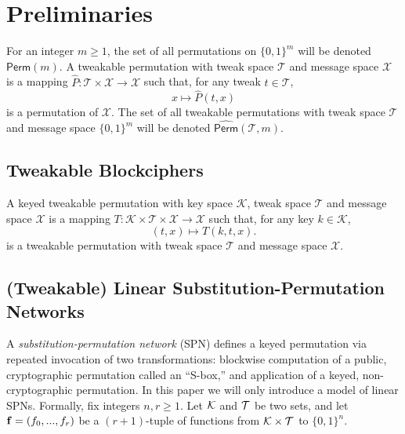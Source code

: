 

\section{Preliminaries}
\label{sec:preliminary}

For an integer $m\geq1$, the set of all permutations on $\{0, 1\}^m$ will be denoted $\textsf{Perm}(m)$. A tweakable permutation with tweak space
$\mathcal{T}$ and message space $\mathcal{X}$ is a mapping $\widehat{P}:\mathcal{T}\times\mathcal{X}\rightarrow\mathcal{X}$ such that, for any tweak
$t\in\mathcal{T}$,
%
$$x\mapsto\widehat{P}(t,x)$$
%
is a permutation of $\mathcal{X}$. The set of all tweakable permutations with tweak space
$\mathcal{T}$ and message space $\{0, 1\}^m$ will be denoted $\widehat{\textsf{Perm}}(\mathcal{T},m)$.




\subsection{Tweakable Blockciphers}
\label{sec:prelim-tbc}

A keyed tweakable permutation with key space $\mathcal{K}$, tweak space $\mathcal{T}$ and message
space $\mathcal{X}$ is a mapping $T:\mathcal{K}\times\mathcal{T}\times\mathcal{X}\rightarrow\mathcal{X}$ such that, for any key $k\in\mathcal{K}$,
%
$$(t,x)\mapsto T(k,t,x).$$
%
is a tweakable permutation with tweak space $\mathcal{T}$ and message space $\mathcal{X}$.



\subsection{(Tweakable) Linear Substitution-Permutation Networks}
\label{sec:prelim-tspn}

A \emph{substitution-permutation network} (SPN) defines a keyed permutation via repeated invocation of two transformations: blockwise computation of a public, cryptographic permutation called an ``S-box,'' and application of a keyed, non-cryptographic permutation. In this paper we will only introduce a model of linear SPNs. Formally, fix integers $n,r\geq1$. Let $\mathcal{K}$ and $\mathcal{T}$ be two
sets, and let $\mathbf{f}= (f_0,...,f_r)$ be a $(r+1)$-tuple of functions from $\mathcal{K}\times\mathcal{T}$ to $\{0, 1\}^n$.


